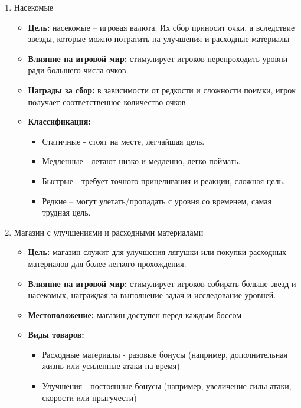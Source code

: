 \documentclass{article}
\begin{document}
\begin{enumerate}
    \item Насекомые
    \begin{itemize}
     \item \textbf{Цель:}  насекомые – игровая валюта. Их сбор приносит очки, а вследствие звезды, которые можно потратить на улучшения и расходные материалы 
     \item \textbf{Влияние на игровой мир:} стимулирует игроков перепроходить уровни ради большего числа очков.
     \item \textbf{Награды за сбор:} в зависимости от редкости и сложности поимки, игрок получает соответственное количество очков
     \item \textbf{Классификация:}
            \begin{itemize}
                \item Статичные - стоят на месте, легчайшая цель.
                \item Медленные - летают низко и медленно, легко поймать.
                \item Быстрые - требует точного прицеливания и реакции, сложная цель.
                \item Редкие – могут улетать/пропадать с уровня со временем, самая трудная цель.
            \end{itemize}
     \end {itemize}

    \item Магазин с улучшениями и расходными материалами
    \begin{itemize}
     \item \textbf{Цель:} магазин служит для улучшения лягушки или покупки расходных материалов для более легкого прохождения. 
     \item \textbf{Влияние на игровой мир:} стимулирует игроков собирать больше звезд и насекомых, награждая за выполнение задач и исследование уровней.
     \item \textbf{Местоположение:} магазин доступен перед каждым боссом
     \item \textbf{Виды товаров:}
     \begin{itemize}
            \item Расходные материалы - разовые бонусы (например, дополнительная жизнь или усиленные атаки на время)
            \item Улучшения - постоянные бонусы (например, увеличение силы атаки, скорости или прыгучести) 
     \end {itemize}
     \end{itemize}


\end{enumerate}
\end{document}

